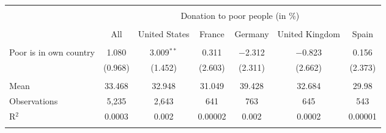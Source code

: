 
\begin{tabular}{@{\extracolsep{5pt}}lcccccc} 
\\[-1.8ex]\hline 
\hline \\[-1.8ex] 
 & \multicolumn{6}{c}{Donation to poor people (in \%)} \\ 
\cline{2-7} 
\\[-1.8ex] & All & United States & France & Germany & United Kingdom & Spain \\ 
\hline \\[-1.8ex] 
 Poor is in own country & 1.080 & 3.009$^{**}$ & 0.311 & $-$2.312 & $-$0.823 & 0.156 \\ 
  & (0.968) & (1.452) & (2.603) & (2.311) & (2.662) & (2.373) \\ 
 \hline \\[-1.8ex] 
Mean & 33.468 & 32.948 & 31.049 & 39.428 & 32.684 & 29.98 \\ 
Observations & 5,235 & 2,643 & 641 & 763 & 645 & 543 \\ 
R$^{2}$ & 0.0003 & 0.002 & 0.00002 & 0.002 & 0.0002 & 0.00001 \\ 
\hline 
\hline \\[-1.8ex] 
\end{tabular} 